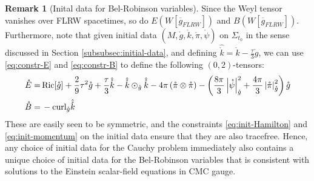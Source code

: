 \documentclass[11pt,leqno,textwidth=10cm]{amsart}
\numberwithin{equation}{section}
\theoremstyle{definition}
\newtheorem{remark}[definition]{Remark}
\theoremstyle{plain}
\newcommand{\1}{\mathbbm{1}}
\newcommand{\g}{\overline{g}}
\newcommand{\Ric}{\text{\normalfont{Ric}}}
\newcommand{\curl}{\text{\normalfont{curl}}}
\newcommand{\change}[1]{\color{black}#1\color{black}}
\begin{document}
\begin{remark}[Inital data for Bel-Robinson variables]\label{rem:init-BR}
Since the Weyl tensor vanishes over FLRW spacetimes, so do $E(W[\g_{FLRW}])$ and $B(W[\g_{FLRW}])$. Furthermore, note that given initial data $(M,\mathring{g},\mathring{k},\mathring{\pi},\mathring{\psi})$ on $\Sigma_{t_0}$ in the sense \change{discussed in Section \ref{subsubsec:initial-data}}, and defining $\hat{\mathring{k}}=\mathring{k}-\frac{\tau}3\mathring{g}$, we can use \eqref{eq:constr-E} and \eqref{eq:constr-B} to define the following $(0,2)$-tensors:
\begin{subequations}
\begin{align}
\label{eq:init-data-E}\mathring{E}=&\,\Ric[\mathring{g}]+\frac29\tau^2\mathring{g}+\frac{\tau}3\hat{\mathring{k}}-\hat{\mathring{k}}\odot_{\mathring{g}}\hat{\mathring{k}}-4\pi\left(\mathring{\pi}\otimes\mathring{\pi}\right)-\left(\frac{8\pi}3\left\lvert\mathring{\psi}\right\rvert_{\mathring{g}}^2+\frac{4\pi}3\left\lvert\mathring{\pi}\right\rvert_{\mathring{g}}^2\right)\mathring{g}\\
\label{eq:init-data-B}\mathring{B}=&\,-\curl_{\mathring{g}}\hat{\mathring{k}}
\end{align}
\end{subequations}
These are easily seen to be symmetric, and the constraints \eqref{eq:init-Hamilton} and \eqref{eq:init-momentum} on the initial data ensure that they are also tracefree. Hence, any choice of initial data for the Cauchy problem immediately also contains a unique choice of initial data for the Bel-Robinson variables that is consistent with solutions to the Einstein scalar-field equations in CMC gauge. 
\end{remark}
\end{document}
